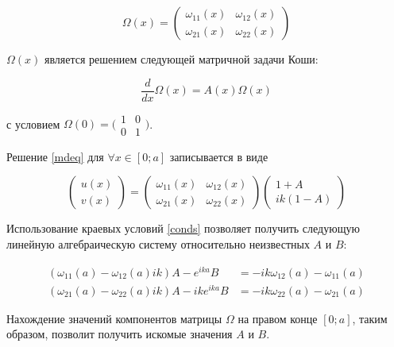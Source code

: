 \documentclass{article}
\numberwithin{equation}{section}
\begin{document}
\begin{equation}\label{fm}
\Omega(x) = \begin{pmatrix}
  \omega_{11}(x) & \omega_{12}(x) \\
  \omega_{21}(x) & \omega_{22}(x)
\end{pmatrix}
\end{equation}

$\Omega(x)$ является решением следующей матричной задачи Коши:

\begin{equation}\label{fmeq}
  \frac{d}{dx} \Omega(x) = A(x) \Omega(x)
\end{equation}

с условием $\Omega(0) = \bigl( \begin{smallmatrix} 1& 0\\ 0&
  1\end{smallmatrix} \bigr)$.

Решение \eqref{mdeq} для $\forall x \in [0; a]$ записывается в виде

\begin{equation}\label{fmsolution}
\begin{pmatrix}
  u(x) \\
  v(x)
\end{pmatrix} = 
\begin{pmatrix}
  \omega_{11}(x) & \omega_{12}(x) \\
  \omega_{21}(x) & \omega_{22}(x)
\end{pmatrix}
\begin{pmatrix}
  1 + A \\
  ik(1 - A)
\end{pmatrix}
\end{equation}

Использование краевых условий \eqref{conds} позволяет получить
следующую линейную алгебраическую систему относительно неизвестных $A$
и $B$:

\begin{equation}\label{abeq}
  \begin{split}
    (\omega_{11}(a) - \omega_{12}(a) ik) A - e^{ika} B &= -ik
    \omega_{12}(a) - \omega_{11}(a) \\
    (\omega_{21}(a) - \omega_{22}(a) ik) A - ike^{ika} B &= -ik
    \omega_{22}(a) - \omega_{21}(a)
  \end{split}
\end{equation}

Нахождение значений компонентов матрицы $\Omega$ на правом конце $[0;
a]$, таким образом, позволит получить искомые значения $A$ и $B$.
\end{document}
